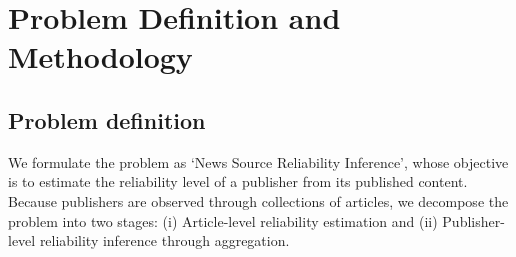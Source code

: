 \documentclass[journal]{IEEEtran}
\begin{document}





\section{Problem Definition and Methodology}
\label{sec:problemDef}

\subsection{Problem definition}\label{subsec:problemdef}
We formulate the problem as `News Source Reliability Inference', whose objective is to estimate the reliability level of a publisher from its published content. Because publishers are observed through collections of articles, we decompose the problem into two stages: (i) Article-level reliability estimation and (ii) Publisher-level reliability inference through aggregation.
\end{document}

